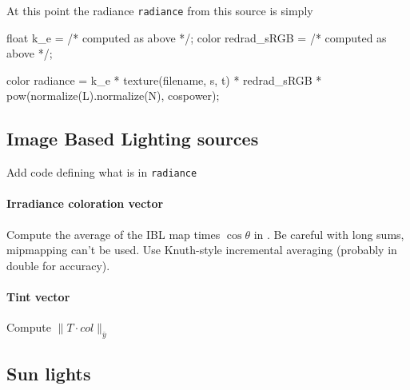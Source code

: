 At this point the radiance \Verb/radiance/ from this source is simply

\begin{rslcode}
float k_e = /* computed as above */;
color redrad_sRGB = /* computed as above */;

color radiance =
    k_e *
    texture(filename, s, t) *
    redrad_sRGB *
    pow(normalize(L).normalize(N), cospower);
\end{rslcode}

\subsection{Image Based Lighting sources}

\begin{inconstruction}
    Add code defining what is in \Verb|radiance|

    \paragraph{Irradiance coloration vector}

    Compute the average of the \gls{IBL} map times $\cos\theta$ in \sRGBl. Be
    careful with long sums, mipmapping can't be used. Use Knuth-style
    incremental averaging (probably in double for accuracy).

    \paragraph{Tint vector}

    Compute $\|T \cdot col\|_{\bar y}$
\end{inconstruction}

\subsection{Sun lights}

